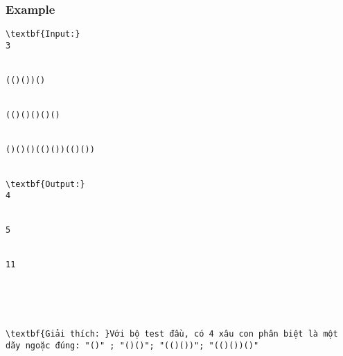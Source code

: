 \subsubsection{   Example  }
\begin{verbatim}
\textbf{Input:}
3


(()())()


(()()()()()


()()()(()())(()())


\textbf{Output:}
4


5


11





\textbf{Giải thích: }Với bộ test đầu, có 4 xâu con phân biệt là một dãy ngoặc đúng: "()" ; "()()"; "(()())"; "(()())()"


\end{verbatim}
